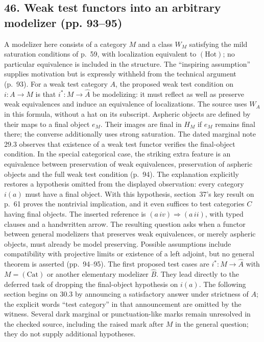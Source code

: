 \documentclass[10pt,oneside]{book}
\begin{document}
\subsection*{46. Weak test functors into an arbitrary modelizer (pp. 93--95)}
A modelizer here consists of a category $M$ and a class $W_M$ satisfying the mild saturation conditions of p.~59, with localization equivalent to $(\mathrm{Hot})$; no particular equivalence is included in the structure. The ``inspiring assumption'' supplies motivation but is expressly withheld from the technical argument (p.~93). For a weak test category $A$, the proposed weak test condition on $i:A\to M$ is that $i^*:M\to\widehat A$ be modelizing: it must reflect as well as preserve weak equivalences and induce an equivalence of localizations. The source uses $W_A$ in this formula, without a hat on its subscript. Aspheric objects are defined by their maps to a final object $e_M$. Their images are final in $H_M$ if $e_M$ remains final there; the converse additionally uses strong saturation. The dated marginal note 29.3 observes that existence of a weak test functor verifies the final-object condition. In the special categorical case, the striking extra feature is an equivalence between preservation of weak equivalences, preservation of aspheric objects and the full weak test condition (p.~94). The explanation explicitly restores a hypothesis omitted from the displayed observation: every category $i(a)$ must have a final object. With this hypothesis, section~37's key result on p.~61 proves the nontrivial implication, and it even suffices to test categories $C$ having final objects. The inserted reference is $(a\,iv)\Rightarrow(a\,ii)$, with typed clauses and a handwritten arrow. The resulting question asks when a functor between general modelizers that preserves weak equivalences, or merely aspheric objects, must already be model preserving. Possible assumptions include compatibility with projective limits or existence of a left adjoint, but no general theorem is asserted (pp.~94--95). The first proposed test cases are $i^*:M\to\widehat A$ with $M=(\mathrm{Cat})$ or another elementary modelizer $\widehat B$. They lead directly to the deferred task of dropping the final-object hypothesis on $i(a)$. The following section begins on 30.3 by announcing a satisfactory answer under strictness of $A$; the explicit words ``test category'' in that announcement are omitted by the witness. Several dark marginal or punctuation-like marks remain unresolved in the checked source, including the raised mark after $M$ in the general question; they do not supply additional hypotheses.
\end{document}

